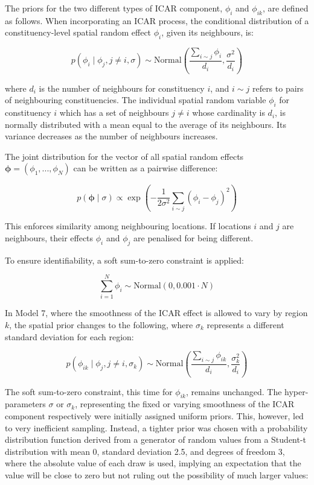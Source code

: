 \documentclass[webpdf,large,contemporary,namedate]{oup-authoring-template}
\theoremstyle{thmstyleone}
\theoremstyle{thmstyletwo}
\theoremstyle{thmstylethree}
\begin{document}
The priors for the two different types of ICAR component, \(\phi_i\) and
\(\phi_{ik}\), are defined as follows. When incorporating an ICAR
process, the conditional distribution of a constituency-level spatial
random effect \(\phi_i\), given its neighbours, is:

\[
p(\phi_i \mid \phi_j, {j \neq i}, \sigma) \sim \text{Normal}\left( \frac{\sum_{i \sim j} \phi_i} {d_i}, \frac{\sigma^2}{d_i} \right)
\]

where \(d_i\) is the number of neighbours for constituency \(i\), and
\(i \sim j\) refers to pairs of neighbouring constituencies. The
individual spatial random variable \(\phi_i\) for constituency \(i\)
which has a set of neighbours \(j \neq i\) whose cardinality is \(d_i\),
is normally distributed with a mean equal to the average of its
neighbours. Its variance decreases as the number of neighbours
increases.

The joint distribution for the vector of all spatial random effects
\(\boldsymbol{\phi} = (\phi_1,...,\phi_N)\) can be written as a pairwise
difference:

\[
p(\boldsymbol{\phi} \mid \sigma) \propto \exp \left( -\frac{1}{2\sigma^2} \sum_{i \sim j} (\phi_i - \phi_j)^2 \right)
\]

This enforces similarity among neighbouring locations. If locations
\(i\) and \(j\) are neighbours, their effects \(\phi_i\) and \(\phi_j\)
are penalised for being different.

To ensure identifiability, a soft sum-to-zero constraint is applied:

\[
\sum_{i=1}^N \phi_i \sim \text{Normal}(0, 0.001 \cdot N)
\]

In Model 7, where the smoothness of the ICAR effect is allowed to vary
by region \(k\), the spatial prior changes to the following, where
\(\sigma_k\) represents a different standard deviation for each region:

\[
p(\phi_{ik} \mid \phi_j, {j \neq i}, \sigma_{k}) \sim \text{Normal}\left( \frac{\sum_{i \sim j} \phi_{ik}} {d_i}, \frac{\sigma^2_{k}}{d_i} \right)
\]

The soft sum-to-zero constraint, this time for \(\phi_{ik}\), remains
unchanged. The hyper-parameters \(\sigma\) or \(\sigma_k\), representing
the fixed or varying smoothness of the ICAR component respectively were
initially assigned uniform priors. This, however, led to very
inefficient sampling. Instead, a tighter prior was chosen with a
probability distribution function derived from a generator of random
values from a Student-t distribution with mean 0, standard deviation
2.5, and degrees of freedom 3, where the absolute value of each draw is
used, implying an expectation that the value will be close to zero but
not ruling out the possibility of much larger values:
\end{document}
